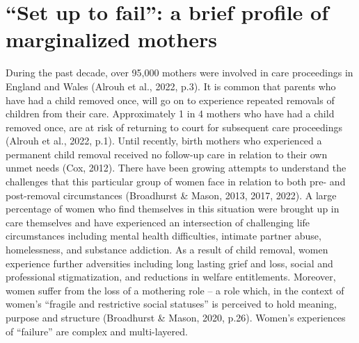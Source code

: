 \documentclass[authordate, empirical, issue]{jote-new-article}
\author[1]{\mbox{Afra Jurkiewicz\orcid{0009-0004-6138-8392}}}
\affil[1]{Nordoff Robbins}
\begin{document}
\begin{frontmatter}
  \maketitle
  \begin{abstract}
    \printabstracttext
  \end{abstract}
\end{frontmatter}

\setcounter{page}{22}

\section{“Set up to fail”: a brief profile of marginalized mothers}







During the past decade, over 95,000 mothers were involved in care proceedings in England and Wales (Alrouh et al., 2022, p.3). It is common that parents who have had a child removed once, will go on to experience repeated removals of children from their care. Approximately 1 in 4 mothers who have had a child removed once, are at risk of returning to court for subsequent care proceedings (Alrouh et al., 2022, p.1). Until recently, birth mothers who experienced a permanent child removal received no follow-up care in relation to their own unmet needs (Cox, 2012). There have been growing attempts to understand the challenges that this particular group of women face in relation to both pre- and post-removal circumstances (Broadhurst \& Mason, 2013, 2017, 2022). A large percentage of women who find themselves in this situation were brought up in care themselves and have experienced an intersection of challenging life circumstances including mental health difficulties, intimate partner abuse, homelessness, and substance addiction. As a result of child removal, women experience further adversities including long lasting grief and loss, social and professional stigmatization, and reductions in welfare entitlements. Moreover, women suffer from the loss of a mothering role -- a role which, in the context of women's “fragile and restrictive social statuses” is perceived to hold meaning, purpose and structure (Broadhurst \& Mason, 2020, p.26). Women's experiences of “failure” are complex and multi-layered.
\end{document}
